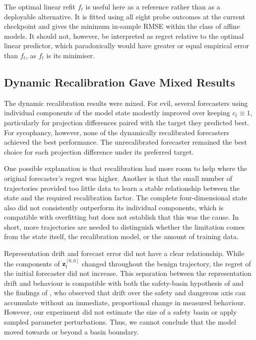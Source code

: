 The optimal linear refit $f_t$ is useful here as a reference rather than as a deployable alternative. It is fitted using all eight probe outcomes at the current checkpoint and gives the minimum in-sample RMSE within the class of affine models. It should not, however, be interpreted as regret relative to the optimal linear predictor, which paradoxically would have greater or equal empirical error than $f_t$, as $f_t$ is its minimiser.

\subsection{Dynamic Recalibration Gave Mixed Results}

The dynamic recalibration results were mixed. For evil, several forecasters using individual components of the model state modestly improved over keeping $c_t\equiv1$, particularly for projection differences paired with the target they predicted best. For sycophancy, however, none of the dynamically recalibrated forecasters achieved the best performance. The unrecalibrated forecaster remained the best choice for each projection difference under its preferred target.

One possible explanation is that recalibration had more room to help where the original forecaster's regret was higher. Another is that the small number of trajectories provided too little data to learn a stable relationship between the state and the required recalibration factor. The complete four-dimensional state also did not consistently outperform its individual components, which is compatible with overfitting but does not establish that this was the cause. In short, more trajectories are needed to distinguish whether the limitation comes from the state itself, the recalibration model, or the amount of training data.

Representation drift and forecast error did not have a clear relationship. While the components of $\mathbf{z}^{[0,0]}_t$ changed throughout the benign trajectory, the regret of the initial forecaster did not increase. This separation between the representation drift and behaviour is compatible with both the safety-basin hypothesis of \citet{Peng2024safety_basin} and the findings of \citet{wang2026parameterdynamicsriskscoring}, who observed that drift over the safety and dangerous axis can accumulate without an immediate, proportional change in measured behaviour. However, our experiment did not estimate the size of a safety basin or apply sampled parameter perturbations. Thus, we cannot conclude that the model moved towards or beyond a basin boundary.

